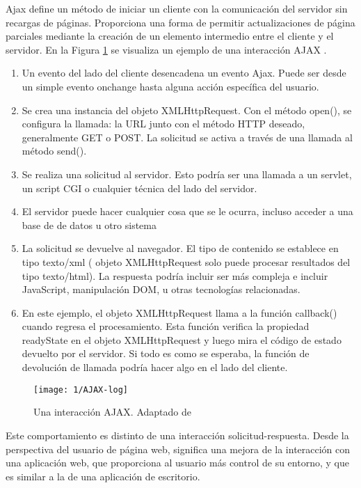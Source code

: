 Ajax define un método de iniciar un cliente con la comunicación del servidor sin recargas de páginas. Proporciona una forma de permitir actualizaciones de página parciales mediante la creación de un elemento intermedio entre el cliente y el servidor. En la Figura \ref{fig:AJAX-how} se visualiza un ejemplo de una interacción AJAX \cite{Asleson2005}. 
\begin{enumerate}
	\item  Un evento del lado del cliente desencadena un evento Ajax. Puede ser desde un simple evento onchange hasta alguna acción específica del usuario.
	
	\item Se crea una instancia del objeto XMLHttpRequest. Con el método open(), se configura la llamada: la URL  junto con el método HTTP deseado, generalmente GET o POST. La solicitud  se activa a través de una llamada al método send().
	
	\item Se realiza una solicitud al servidor. Esto podría ser una llamada a un servlet, un script CGI o cualquier 	técnica del lado del servidor.
	\item El servidor puede hacer cualquier cosa que se le ocurra, incluso acceder a una base de  de datos u	otro sistema
	\item La solicitud se devuelve al navegador. El tipo de contenido se establece en tipo texto/xml ( objeto XMLHttpRequest solo puede procesar resultados del tipo texto/html). La respuesta podría incluir ser más compleja e incluir JavaScript, manipulación DOM,
	u otras tecnologías relacionadas.
	\item En este ejemplo, el objeto XMLHttpRequest llama a la función callback() cuando regresa el procesamiento. Esta función verifica la propiedad readyState en el objeto XMLHttpRequest y luego mira el código de estado devuelto por el servidor. Si todo es como se esperaba, la función de devolución de llamada podría hacer algo en el  lado del cliente.
\end{enumerate}


\begin{figure} %
			\begin{center}
		\texttt{[image: 1/AJAX-log]}
	\caption{Una interacción AJAX. Adaptado de \cite{Asleson2005}  }
	\label{fig:AJAX-how}
			\end{center}
\end{figure}

Este comportamiento es distinto de una interacción solicitud-respuesta. Desde la perspectiva del usuario de página web, significa  una mejora de la interacción con una aplicación web, que proporciona al usuario más control de su entorno, y que es similar a la de una aplicación de escritorio.




